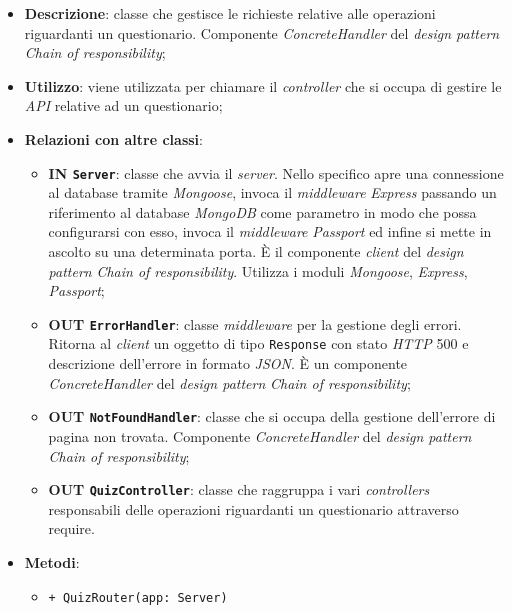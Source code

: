 	\begin{itemize}
		\item \textbf{Descrizione}: classe che gestisce le richieste relative alle operazioni riguardanti un questionario. Componente \textit{ConcreteHandler} del \textit{design pattern} \textit{Chain of responsibility};
		\item \textbf{Utilizzo}: viene utilizzata per chiamare il \textit{controller} che si occupa di gestire le \textit{API} relative ad un questionario;
		\item \textbf{Relazioni con altre classi}:
		\begin{itemize}
		\item \textbf{IN \texttt{Server}}: classe che avvia il \textit{server}. Nello specifico apre una connessione al database tramite \textit{Mongoose}, invoca il \textit{middleware} \textit{Express} passando un riferimento al database \textit{MongoDB} come parametro in modo che possa configurarsi con esso, invoca il \textit{middleware} \textit{Passport} ed infine si mette in ascolto su una determinata porta. È il componente \textit{client} del \textit{design pattern} \textit{Chain of responsibility}. Utilizza i moduli \textit{Mongoose}, \textit{Express}, \textit{Passport};
		\item \textbf{OUT \texttt{ErrorHandler}}: classe \textit{middleware} per la gestione degli errori. Ritorna al \textit{client} un oggetto di tipo \texttt{Response} con stato \textit{HTTP} 500 e descrizione dell'errore in formato \textit{JSON}. È un componente \textit{ConcreteHandler} del \textit{design pattern} \textit{Chain of responsibility};
		\item \textbf{OUT \texttt{NotFoundHandler}}: classe che si occupa della gestione dell'errore di pagina non trovata. Componente \textit{ConcreteHandler} del \textit{design pattern} \textit{Chain of responsibility};
		\item \textbf{OUT \texttt{QuizController}}: classe che raggruppa i vari \textit{controllers} responsabili delle operazioni riguardanti un questionario attraverso require.
		\end{itemize}
		\item \textbf{Metodi}:
		\begin{itemize}
		\item \texttt{+ QuizRouter(app: Server)} \\

\end{itemize}
\end{itemize}
